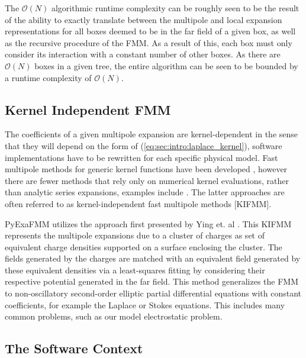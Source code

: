 \documentclass{IEEEcsmag}
\begin{document}
The $\mathcal{O}(N)$ algorithmic runtime complexity can be roughly seen to be the result of the ability to exactly translate between the multipole and local expansion representations for all boxes deemed to be in the far field of a given box, as well as the recursive procedure of the FMM. As a result of this, each box must only consider its interaction with a constant number of other boxes. As there are $\mathcal{O}(N)$ boxes in a given tree, the entire algorithm can be seen to be bounded by a runtime complexity of $\mathcal{O}(N)$.

\subsection{Kernel Independent FMM}

The coefficients of a given multipole expansion are kernel-dependent in the sense that they will depend on the form of (\ref{eq:sec:intro:laplace_kernel}), software implementations have to be rewritten for each specific physical model. Fast multipole methods for generic kernel functions have been developed \cite{Gimbutas2003}, however there are fewer methods that rely only on numerical kernel evaluations, rather than analytic series expansions, examples include \cite{Fong2009, Ying2004}. The latter approaches are often referred to as kernel-independent fast multipole methods [KIFMM].

PyExaFMM utilizes the approach first presented by Ying et. al \cite{Ying2004}. This KIFMM represents the multipole expansions due to a cluster of charges as set of equivalent charge densities supported on a surface enclosing the cluster. The fields generated by the charges are matched with an equivalent field generated by these equivalent densities via a least-squares fitting by considering their respective potential generated in the far field. This method generalizes the FMM to non-oscillatory second-order elliptic partial differential equations with constant coefficients, for example the Laplace or Stokes equations. This includes many common problems, such as our model electrostatic problem.

\subsection{The Software Context}\label{sec:intro:motivation}
\end{document}
